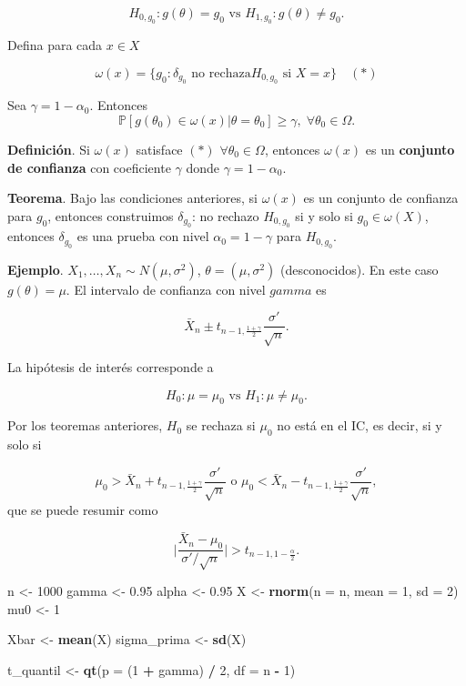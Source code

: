 \documentclass[
  12pt,
]{book}
\newenvironment{Shaded}{\begin{snugshade}}{\end{snugshade}}
\newcommand{\DataTypeTok}[1]{\textcolor[rgb]{0.13,0.29,0.53}{#1}}
\newcommand{\DecValTok}[1]{\textcolor[rgb]{0.00,0.00,0.81}{#1}}
\newcommand{\FloatTok}[1]{\textcolor[rgb]{0.00,0.00,0.81}{#1}}
\newcommand{\KeywordTok}[1]{\textcolor[rgb]{0.13,0.29,0.53}{\textbf{#1}}}
\newcommand{\NormalTok}[1]{#1}
\newcommand{\OperatorTok}[1]{\textcolor[rgb]{0.81,0.36,0.00}{\textbf{#1}}}
\newcommand{\StringTok}[1]{\textcolor[rgb]{0.31,0.60,0.02}{#1}}
\begin{document}
\[H_{0,g_0}: g(\theta) = g_0 \text{ vs } H_{1,g_0}: g(\theta) \neq g_0. \]

Defina para cada \(x\in X\)

\[\omega(x) = \{g_0: \delta_{g_0} \text{ no rechaza
}H_{0,g_0}\text{ si }X=x\} \quad (*)\]

Sea \(\gamma = 1-\alpha_0\). Entonces \[\mathbb P[g(\theta_0)\in \omega(x)|\theta
= \theta_0 ] \geq \gamma, \;\forall \theta_0 \in \Omega.\]

\textbf{Definición}. Si \(\omega(x)\) satisface \((*)\) \(\forall \theta_0 \in \Omega\),
entonces \(\omega(x)\) es un \textbf{conjunto de confianza} con coeficiente \(\gamma\)
donde \(\gamma = 1-\alpha_0\).

\textbf{Teorema}. Bajo las condiciones anteriores, si \(\omega(x)\) es un conjunto de
confianza para \(g_0\), entonces construimos \(\delta_{g_0}\): no rechazo
\(H_{0,g_0}\) si y solo si \(g_0 \in \omega(X)\), entonces \(\delta_{g_0}\) es una
prueba con nivel \(\alpha_0 = 1-\gamma\) para \(H_{0,g_0}\).

\textbf{Ejemplo}. \(X_1,\dots,X_n\sim N(\mu,\sigma^2)\), \(\theta = (\mu,\sigma^2)\)
(desconocidos). En este caso \(g(\theta) = \mu\). El intervalo de confianza con
nivel \(gamma\) es

\[\bar X_n\pm t_{n-1,\frac{1+\gamma}2}\dfrac{\sigma'}{\sqrt n}.\]

La hipótesis de interés corresponde a

\[ H_0: \mu = \mu_0 \text{ vs } H_1: \mu \ne \mu_0.\]

Por los teoremas anteriores, \(H_0\) se rechaza si \(\mu_0\) no está en el IC, es
decir, si y solo si

\[\mu_0 > \bar X_n+ t_{n-1,\frac{1+\gamma}2}\dfrac{\sigma'}{\sqrt n} \text{ o }
\mu_0 < \bar X_n- t_{n-1,\frac{1+\gamma}2}\dfrac{\sigma'}{\sqrt n},\] que se
puede resumir como

\[\bigg|\dfrac{\bar X_n-\mu_0}{\sigma'/\sqrt n}\bigg|>t_{n-1,1-\frac{\alpha}2}.\]

\begin{Shaded}
\begin{Highlighting}[]
\NormalTok{n \textless{}{-}}\StringTok{ }\DecValTok{1000}
\NormalTok{gamma \textless{}{-}}\StringTok{ }\FloatTok{0.95}
\NormalTok{alpha \textless{}{-}}\StringTok{ }\FloatTok{0.95}
\NormalTok{X \textless{}{-}}\StringTok{ }\KeywordTok{rnorm}\NormalTok{(}\DataTypeTok{n =}\NormalTok{ n, }\DataTypeTok{mean =} \DecValTok{1}\NormalTok{, }\DataTypeTok{sd =} \DecValTok{2}\NormalTok{)}
\NormalTok{mu0 \textless{}{-}}\StringTok{ }\DecValTok{1}

\NormalTok{Xbar \textless{}{-}}\StringTok{ }\KeywordTok{mean}\NormalTok{(X)}
\NormalTok{sigma\_prima \textless{}{-}}\StringTok{ }\KeywordTok{sd}\NormalTok{(X)}



\NormalTok{t\_quantil \textless{}{-}}\StringTok{ }\KeywordTok{qt}\NormalTok{(}\DataTypeTok{p =}\NormalTok{ (}\DecValTok{1} \OperatorTok{+}\StringTok{ }\NormalTok{gamma) }\OperatorTok{/}\StringTok{ }\DecValTok{2}\NormalTok{, }\DataTypeTok{df =}\NormalTok{ n }\OperatorTok{{-}}\StringTok{ }\DecValTok{1}\NormalTok{)}
\end{Highlighting}
\end{Shaded}
\end{document}
